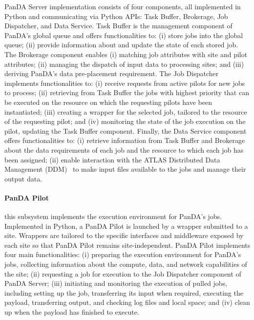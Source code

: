 
PanDA Server implementation consists of four components, all implemented in
Python and communicating via Python APIs: Task Buffer, Brokerage, Job
Dispatcher, and Data Service. Task Buffer is the management component of PanDA's
global queue and offers functionalities to: (i) store jobs into the global
queue; (ii) provide information about and update the state of each stored job.
The Brokerage component enables (i) matching job attributes with site and pilot
attributes; (ii) managing the dispatch of input data to processing sites; and
(iii) deriving PanDA's data pre-placement requirement.
The Job Dispatcher implements functionalities to: (i) receive requests from
active pilots for new jobs to process; (ii) retrieving from Task Buffer the jobs
with highest priority that can be executed on the resource on which the
requesting pilots have been instantiated; (iii) creating a wrapper for the
selected job, tailored to the resource of the requesting pilot; and (iv)
monitoring the state of the job execution on the pilot, updating the Task Buffer
component. Finally, the Data Service component offers functionalities to: (i)
retrieve information from Task Buffer and Brokerage about the data requirements
of each job and the resource to which each job has been assigned; (ii) enable
interaction with the ATLAS Distributed Data Management (DDM)~\cite{atlas_ddm} to
make input files available to the jobs and manage their output data.

\paragraph{\textbf{PanDA Pilot}} this subsystem implements the execution
environment for PanDA's jobs. Implemented in Python, a PanDA Pilot is launched
by a wrapper submitted to a site. Wrappers are tailored to the
specific interfaces and middleware exposed by each site so that PanDA Pilot
remains site-independent. PanDA Pilot implements four main functionalities: (i)
preparing the execution environment for PanDA's jobs,
collecting information about the compute, data, and network capabilities of the
site; (ii) requesting a job for execution to the Job Dispatcher component of
PanDA Server; (iii) initiating and monitoring the execution of pulled jobs,
including setting up the job, transferring its input when required, executing
the payload, transferring output, and checking log files and local space; and
(iv) clean up when the payload has finished to execute.

